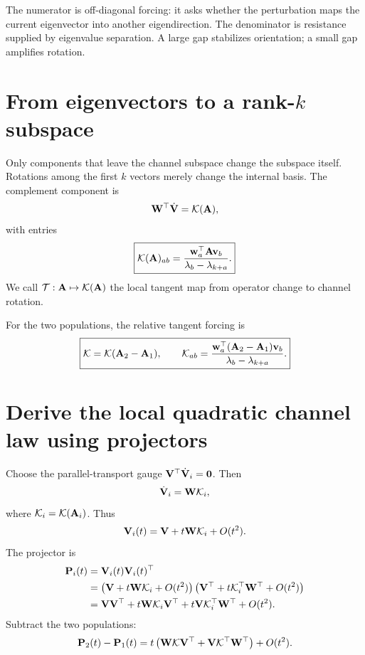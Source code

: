 \begin{mathteach}
The numerator is off-diagonal forcing: it asks whether the perturbation maps the current eigenvector into another eigendirection. The denominator is resistance supplied by eigenvalue separation. A large gap stabilizes orientation; a small gap amplifies rotation.
\end{mathteach}

\section{From eigenvectors to a rank-\(k\) subspace}

Only components that leave the channel subspace change the subspace itself. Rotations among the first \(k\) vectors merely change the internal basis. The complement component is
\begin{equation}
\mathbf{W}^\top\dot{\mathbf{V}}=\mathcal K(\mathbf{A}),
\end{equation}
with entries
\begin{equation}
\boxed{
\mathcal K(\mathbf{A})_{ab}
=\frac{\mathbf w_a^\top\mathbf{A}\mathbf v_b}
{\lambda_b-\lambda_{k+a}}.}
\label{eq:tangentMap}
\end{equation}
We call \(\mathcal T:\mathbf{A}\mapsto\mathcal K(\mathbf{A})\) the local tangent map from operator change to channel rotation.

For the two populations, the relative tangent forcing is
\begin{equation}
\boxed{
\mathcal K=\mathcal K(\mathbf{A}_2-\mathbf{A}_1),
\qquad
\mathcal K_{ab}=
\frac{\mathbf w_a^\top(\mathbf{A}_2-\mathbf{A}_1)\mathbf v_b}
{\lambda_b-\lambda_{k+a}}.}
\label{eq:relativeK}
\end{equation}

\section{Derive the local quadratic channel law using projectors}

Choose the parallel-transport gauge \(\mathbf{V}^\top\dot{\mathbf{V}}_i=\mathbf{0}\). Then
\begin{equation}
\dot{\mathbf{V}}_i=\mathbf{W}\mathcal K_i,
\end{equation}
where \(\mathcal K_i=\mathcal K(\mathbf{A}_i)\). Thus
\begin{equation}
\mathbf{V}_i(t)=\mathbf{V}+t\mathbf{W}\mathcal K_i+O(t^2).
\end{equation}
The projector is
\begin{align}
\mathbf{P}_i(t)
&=\mathbf{V}_i(t)\mathbf{V}_i(t)^\top\\
&=\left(\mathbf{V}+t\mathbf{W}\mathcal K_i+O(t^2)\right)
\left(\mathbf{V}^\top+t\mathcal K_i^\top\mathbf{W}^\top+O(t^2)\right)\\
&=\mathbf{V}\mathbf{V}^\top
+t\mathbf{W}\mathcal K_i\mathbf{V}^\top
+t\mathbf{V}\mathcal K_i^\top\mathbf{W}^\top
+O(t^2).
\end{align}
Subtract the two populations:
\begin{equation}
\mathbf{P}_2(t)-\mathbf{P}_1(t)
=t\left(\mathbf{W}\mathcal K\mathbf{V}^\top+\mathbf{V}\mathcal K^\top\mathbf{W}^\top\right)+O(t^2).
\label{eq:projectorDifferenceExpansion}
\end{equation}

